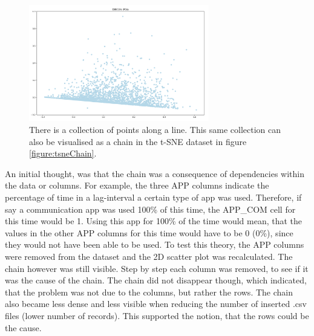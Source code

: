 \begin{figure}[h]
  \centering
  \includegraphics[width=0.7\textwidth]{./images/pcaChain.png}
  \caption{There is a collection of points along a line. This same collection can also be visualised as a chain in the t-SNE dataset in figure \ref{figure:tsneChain}.}
  \label{figure:pcaChain}
\end{figure}

An initial thought, was that the chain was a consequence of dependencies within the data or columns. For example, the three APP columns indicate the percentage of time in a lag-interval a certain type of app was used. Therefore, if say a communication app was used 100\% of this time, the APP\_COM cell for this time would be 1. Using this app for 100\% of the time would mean, that the values in the other APP columns for this time would have to be 0 (0\%), since they would not have been able to be used. To test this theory, the APP columns were removed from the dataset and the 2D scatter plot was recalculated. The chain however was still visible. Step by step each column was removed, to see if it was the cause of the chain. The chain did not disappear though, which indicated, that the problem was not due to the columns, but rather the rows.  The chain also became less dense and less visible when reducing the number of inserted .csv files (lower number of records). This supported the notion, that the rows could be the cause.


